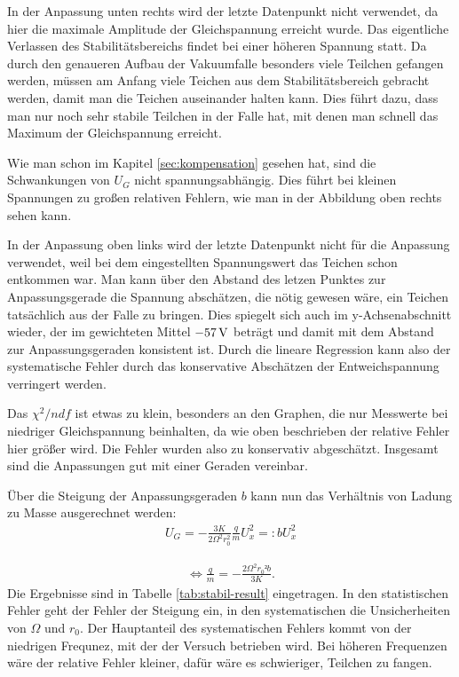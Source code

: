\documentclass[a4paper,12pt]{article}
\begin{document}
In der Anpassung unten rechts wird der letzte Datenpunkt nicht verwendet, da hier die maximale Amplitude der Gleichspannung erreicht wurde.
Das eigentliche Verlassen des Stabilitätsbereichs findet bei einer höheren Spannung statt.
Da durch den genaueren Aufbau der Vakuumfalle besonders viele Teilchen gefangen werden, müssen am Anfang viele Teichen aus dem Stabilitätsbereich gebracht werden, 
damit man die Teichen auseinander halten kann.
Dies führt dazu, dass man nur noch sehr stabile Teilchen in der Falle hat, mit denen man schnell das Maximum der Gleichspannung erreicht.

Wie man schon im Kapitel \ref{sec:kompensation} gesehen hat, sind die Schwankungen von $U_G$ nicht spannungsabhängig.
Dies führt bei kleinen Spannungen zu großen relativen Fehlern, wie man in der Abbildung oben rechts sehen kann.


In der Anpassung oben links wird der letzte Datenpunkt nicht für die Anpassung verwendet, weil bei dem eingestellten Spannungswert das Teichen schon entkommen war.
Man kann über den Abstand des letzen Punktes zur Anpassungsgerade die Spannung abschätzen, die nötig gewesen wäre, ein Teichen tatsächlich aus der Falle zu bringen.
Dies spiegelt sich auch im y-Achsenabschnitt wieder, der im gewichteten Mittel $-\unit[57]{V}$ beträgt und damit mit dem Abstand zur Anpassungsgeraden konsistent ist.
Durch die lineare Regression kann also der systematische Fehler durch das konservative Abschätzen der Entweichspannung verringert werden.


Das $χ^2/ndf$ ist etwas zu klein, besonders an den Graphen, die nur Messwerte bei niedriger Gleichspannung beinhalten, da wie oben beschrieben der relative Fehler hier größer wird.
Die Fehler wurden also zu konservativ abgeschätzt.
Insgesamt sind die Anpassungen gut mit einer Geraden vereinbar.


Über die Steigung der Anpassungsgeraden $b$ kann nun das Verhältnis von Ladung zu Masse ausgerechnet werden:
\begin{align*}
	U_G = -\frac{3K}{2Ω^2r_0^2}\frac{q}{m} U_x^2 =: b U_x^2
\end{align*}

\begin{align*}
	\Leftrightarrow \frac{q}{m} = -\frac{2Ω^2r_0² b}{3K}.
\end{align*}
Die Ergebnisse sind in Tabelle \ref{tab:stabil-result} eingetragen.
In den statistischen Fehler geht der Fehler der Steigung ein, in den systematischen die Unsicherheiten von $Ω$ und $r_0$.
Der Hauptanteil des systematischen Fehlers kommt von der niedrigen Frequnez, mit der der Versuch betrieben wird.
Bei höheren Frequenzen wäre der relative Fehler kleiner, dafür wäre es schwieriger, Teilchen zu fangen.
\end{document}
